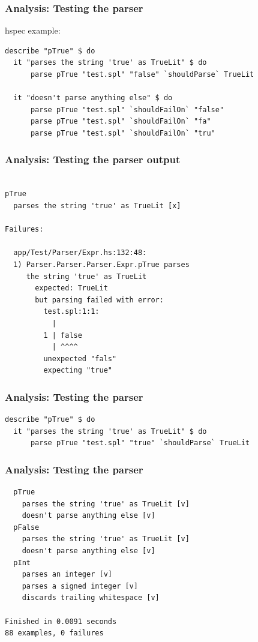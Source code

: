 \documentclass{beamer}
\begin{document}
\begin{frame}[fragile]
  \frametitle{Analysis: Testing the parser}

  hspec example:

    \begin{verbatim}
describe "pTrue" $ do
  it "parses the string 'true' as TrueLit" $ do
      parse pTrue "test.spl" "false" `shouldParse` TrueLit

  it "doesn't parse anything else" $ do
      parse pTrue "test.spl" `shouldFailOn` "false"
      parse pTrue "test.spl" `shouldFailOn` "fa"
      parse pTrue "test.spl" `shouldFailOn` "tru"

    \end{verbatim}
\end{frame}

\begin{frame}[fragile]
  \frametitle{Analysis: Testing the parser output}


    \begin{verbatim}

pTrue
  parses the string 'true' as TrueLit [x]

Failures:

  app/Test/Parser/Expr.hs:132:48: 
  1) Parser.Parser.Parser.Expr.pTrue parses 
     the string 'true' as TrueLit
       expected: TrueLit
       but parsing failed with error:
         test.spl:1:1:
           |
         1 | false
           | ^^^^
         unexpected "fals"
         expecting "true"
    \end{verbatim}
\end{frame}

\begin{frame}[fragile]
  \frametitle{Analysis: Testing the parser}


    \begin{verbatim}
describe "pTrue" $ do
  it "parses the string 'true' as TrueLit" $ do
      parse pTrue "test.spl" "true" `shouldParse` TrueLit
    \end{verbatim}
\end{frame}

\begin{frame}[fragile]
  \frametitle{Analysis: Testing the parser}


    \begin{verbatim}
  pTrue
    parses the string 'true' as TrueLit [v]
    doesn't parse anything else [v]
  pFalse
    parses the string 'true' as TrueLit [v]
    doesn't parse anything else [v]
  pInt
    parses an integer [v]
    parses a signed integer [v]
    discards trailing whitespace [v]

Finished in 0.0091 seconds
88 examples, 0 failures
    \end{verbatim}
\end{frame}
\end{document}
